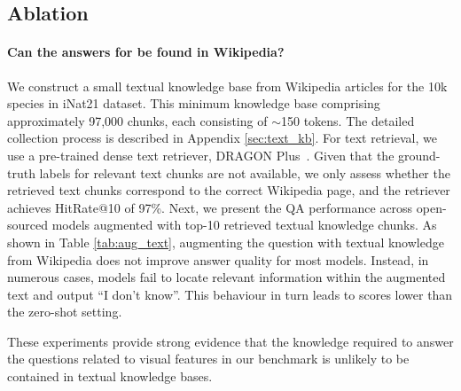 \subsection{Ablation}
\paragraph{Can the answers for \ds be found in Wikipedia?}

We construct a small textual knowledge base from Wikipedia articles for the 10k species in iNat21 dataset. This minimum knowledge base comprising approximately 97,000 chunks, each consisting of $\sim$150 tokens. The detailed collection process is described in Appendix \ref{sec:text_kb}. For text retrieval, we use a pre-trained dense text retriever, DRAGON Plus~\citep{lin-etal-2023-train}. Given that the ground-truth labels for relevant text chunks are not available, we only assess whether the retrieved text chunks correspond to the correct Wikipedia page, and the retriever achieves HitRate@10 of 97\%. Next, we present the QA performance across open-sourced models augmented with top-10 retrieved textual knowledge chunks. As shown in Table \ref{tab:aug_text}, augmenting the question with textual knowledge from Wikipedia does not improve answer quality for most models. Instead, in numerous cases, models fail to locate relevant information within the augmented text and output ``I don't know''. This behaviour in turn leads to scores lower than the zero-shot setting.

These experiments provide strong evidence that the knowledge required to answer the questions related to visual features in our benchmark is unlikely to be contained in textual knowledge bases.

